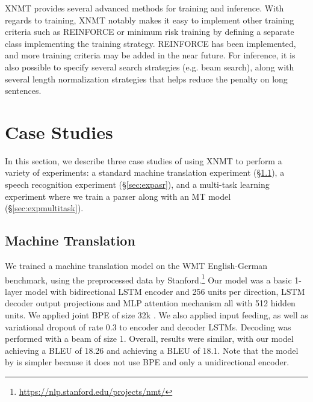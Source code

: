 \documentclass[]{article}
\begin{document}
XNMT provides several advanced methods for training and inference.
With regards to training, XNMT notably makes it easy to implement other training criteria such as REINFORCE or minimum risk training by defining a separate class implementing the training strategy.
REINFORCE has been implemented, and more training criteria may be added in the near future.
For inference, it is also possible to specify several search strategies (e.g. beam search), along with several length normalization strategies that helps reduce the penalty on long sentences.

\section{Case Studies}

In this section, we describe three case studies of using XNMT to perform a variety of experiments: a standard machine translation experiment (\S\ref{sec:expmt}), a speech recognition experiment (\S\ref{sec:expasr}), and a multi-task learning experiment where we train a parser along with an MT model (\S\ref{sec:expmultitask}).

\subsection{Machine Translation}
\label{sec:expmt}
We trained a machine translation model on the WMT English-German benchmark, using the preprocessed data by Stanford.\footnote{\url{https://nlp.stanford.edu/projects/nmt/}} Our model was a basic 1-layer model with bidirectional LSTM encoder and 256 units per direction, LSTM decoder output projections and MLP attention mechanism all with 512 hidden units. We applied joint BPE of size 32k \citep{sennrich2016bpe}. We also applied input feeding, as well as variational dropout of rate 0.3 to encoder and decoder LSTMs. Decoding was performed with a beam of size 1. Overall, results were similar, with our model achieving a BLEU of 18.26 and \citet{luong2015effective} achieving a BLEU of 18.1. Note that the model by \citet{luong2015effective} is simpler because it does not use BPE and only a unidirectional encoder.

\end{document}
